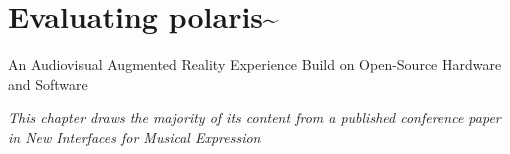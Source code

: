 \chapter{Evaluating polaris\textasciitilde{}}{An Audiovisual Augmented Reality Experience Build on Open-Source Hardware and Software}
\label{sec: polaris}
\epigraph{\emph{This chapter draws the majority of its content from a published conference paper in New Interfaces for Musical Expression}}{\citep[]{bilbow2022}}






